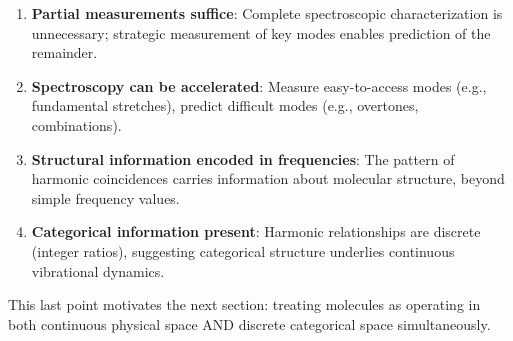 \begin{enumerate}
\item \textbf{Partial measurements suffice}: Complete spectroscopic characterization is unnecessary; strategic measurement of key modes enables prediction of the remainder.

\item \textbf{Spectroscopy can be accelerated}: Measure easy-to-access modes (e.g., fundamental stretches), predict difficult modes (e.g., overtones, combinations).

\item \textbf{Structural information encoded in frequencies}: The pattern of harmonic coincidences carries information about molecular structure, beyond simple frequency values.

\item \textbf{Categorical information present}: Harmonic relationships are discrete (integer ratios), suggesting categorical structure underlies continuous vibrational dynamics.
\end{enumerate}

This last point motivates the next section: treating molecules as operating in both continuous physical space AND discrete categorical space simultaneously.

